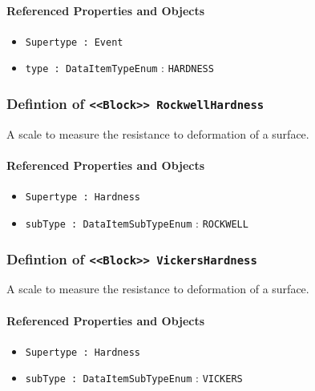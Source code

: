 \paragraph{Referenced Properties and Objects}

\begin{itemize}
\item \texttt{Supertype : Event}

\item \texttt{type : DataItemTypeEnum} : \texttt{HARDNESS}

\end{itemize}
\FloatBarrier
\subsubsection{Defintion of \texttt{<<Block>> RockwellHardness}}
  \label{type:RockwellHardness}

\FloatBarrier

A scale to measure the resistance to deformation of a surface.

\FloatBarrier
\paragraph{Referenced Properties and Objects}

\begin{itemize}
\item \texttt{Supertype : Hardness}

\item \texttt{subType : DataItemSubTypeEnum} : \texttt{ROCKWELL}

\end{itemize}
\FloatBarrier
\subsubsection{Defintion of \texttt{<<Block>> VickersHardness}}
  \label{type:VickersHardness}

\FloatBarrier

A scale to measure the resistance to deformation of a surface.

\FloatBarrier
\paragraph{Referenced Properties and Objects}

\begin{itemize}
\item \texttt{Supertype : Hardness}

\item \texttt{subType : DataItemSubTypeEnum} : \texttt{VICKERS}

\end{itemize}
\FloatBarrier
